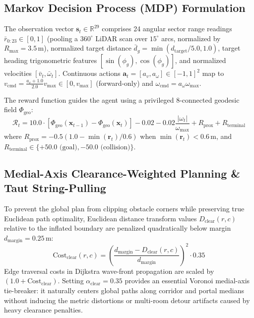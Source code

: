 \documentclass[runningheads]{llncs}
\begin{document}
\subsection{Markov Decision Process (MDP) Formulation}
The observation vector $\mathbf{s}_t \in \mathbb{R}^{29}$ comprises 24 angular sector range readings $\bar{r}_{0:23} \in [0, 1]$ (pooling a $360^\circ$ LiDAR scan over $15^\circ$ arcs, normalized by $R_{\max} = 3.5\,\text{m}$), normalized target distance $\bar{d}_g = \min(d_{\text{target}}/5.0, 1.0)$, target heading trigonometric features $[\sin(\phi_g), \cos(\phi_g)]$, and normalized velocities $[\bar{v}_t, \bar{\omega}_t]$. Continuous actions $\mathbf{a}_t = [a_v, a_\omega] \in [-1, 1]^2$ map to $v_{\text{cmd}} = \frac{a_v + 1.0}{2.0} v_{\max} \in [0, v_{\max}]$ (forward-only) and $\omega_{\text{cmd}} = a_\omega \omega_{\max}$.

The reward function guides the agent using a privileged 8-connected geodesic field $\Phi_{\text{geo}}$:
\begin{equation}
\mathcal{R}_t = 10.0 \cdot \left[ \Phi_{\text{geo}}(\mathbf{x}_{t-1}) - \Phi_{\text{geo}}(\mathbf{x}_t) \right] - 0.02 - 0.02 \frac{|\omega_t|}{\omega_{\max}} + R_{\text{prox}} + R_{\text{terminal}}
\end{equation}
where $R_{\text{prox}} = -0.5 (1.0 - \min(\mathbf{r}_t)/0.6)$ when $\min(\mathbf{r}_t) < 0.6\,\text{m}$, and $R_{\text{terminal}} \in \{+50.0 \text{ (goal)}, -50.0 \text{ (collision)}\}$.

\subsection{Medial-Axis Clearance-Weighted Planning \& Taut String-Pulling}
To prevent the global plan from clipping obstacle corners while preserving true Euclidean path optimality, Euclidean distance transform values $D_{\text{clear}}(r, c)$ relative to the inflated boundary are penalized quadratically below margin $d_{\text{margin}} = 0.25\,\text{m}$:
\begin{equation}
\text{Cost}_{\text{clear}}(r, c) = \left( \frac{d_{\text{margin}} - D_{\text{clear}}(r, c)}{d_{\text{margin}}} \right)^2 \cdot 0.35
\end{equation}
Edge traversal costs in Dijkstra wave-front propagation are scaled by $(1.0 + \text{Cost}_{\text{clear}})$. Setting $\alpha_{\text{clear}} = 0.35$ provides an essential Voronoi medial-axis tie-breaker: it naturally centers global paths along corridor and portal medians without inducing the metric distortions or multi-room detour artifacts caused by heavy clearance penalties. 
\end{document}
